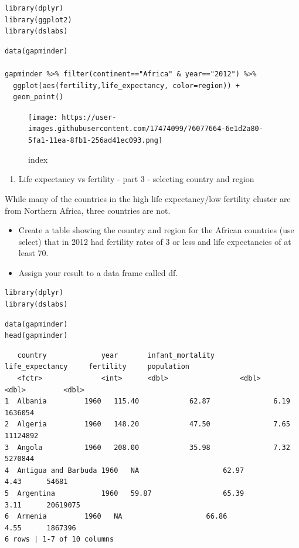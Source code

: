 \documentclass[
]{article}
\providecommand{\tightlist}{%
  \setlength{\itemsep}{0pt}\setlength{\parskip}{0pt}}
\begin{document}
\begin{verbatim}
library(dplyr)
library(ggplot2)
library(dslabs)
\end{verbatim}

\begin{verbatim}
data(gapminder)

gapminder %>% filter(continent=="Africa" & year=="2012") %>%
  ggplot(aes(fertility,life_expectancy, color=region)) +
  geom_point()
\end{verbatim}

\begin{figure}
\centering
\texttt{[image: https://user-images.githubusercontent.com/17474099/76077664-6e1d2a80-5fa1-11ea-8fb1-256ad41ec093.png]}
\caption{index}
\end{figure}

\begin{enumerate}
\def\labelenumi{\arabic{enumi}.}
\setcounter{enumi}{2}
\tightlist
\item
  Life expectancy vs fertility - part 3 - selecting country and region
\end{enumerate}

While many of the countries in the high life expectancy/low fertility
cluster are from Northern Africa, three countries are not.

\begin{itemize}
\tightlist
\item
  Create a table showing the country and region for the African
  countries (use select) that in 2012 had fertility rates of 3 or less
  and life expectancies of at least 70.
\item
  Assign your result to a data frame called df.
\end{itemize}

\begin{verbatim}
library(dplyr)
library(dslabs)
\end{verbatim}

\begin{verbatim}
data(gapminder)
head(gapminder)
\end{verbatim}

\begin{verbatim}
   country             year       infant_mortality      life_expectancy     fertility     population
   <fctr>              <int>      <dbl>                 <dbl>               <dbl>         <dbl>
1  Albania         1960   115.40            62.87               6.19      1636054   
2  Algeria         1960   148.20            47.50               7.65      11124892  
3  Angola          1960   208.00            35.98               7.32      5270844   
4  Antigua and Barbuda 1960   NA                    62.97               4.43      54681 
5  Argentina           1960   59.87                 65.39               3.11      20619075  
6  Armenia         1960   NA                    66.86               4.55      1867396   
6 rows | 1-7 of 10 columns
\end{verbatim}
\end{document}
